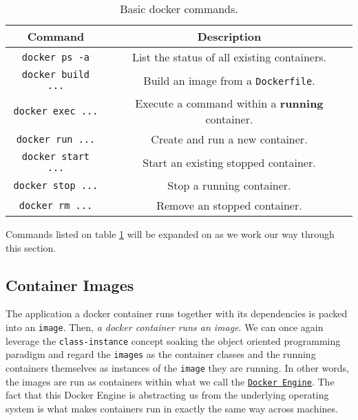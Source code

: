             \begin{table}
                \centering
                \begin{tabular}{|c|c|}
                    \hline
                    \textbf{Command} & \textbf{Description}\\
                    \hline
                    \texttt{docker ps -a} & List the status of all existing containers.\\
                    \hline
                    \texttt{docker build ...} & Build an image from a \texttt{Dockerfile}.\\
                    \hline
                    \texttt{docker exec ...} & Execute a command within a \textbf{running} container.\\
                    \hline
                    \texttt{docker run ...} & Create and run a new container.\\
                    \hline
                    \texttt{docker start ...} & Start an existing stopped container.\\
                    \hline
                    \texttt{docker stop ...} & Stop a running container.\\
                    \hline
                    \texttt{docker rm ...} & Remove an stopped container.\\
                    \hline
                \end{tabular}
                \caption{Basic docker commands.}
                \label{tab:docker-commands}
            \end{table}

            Commands listed on table \ref{tab:docker-commands} will be expanded on as we work our way through this section.\\

        \subsection{Container Images}
            The application a docker container runs together with its dependencies is packed into an \texttt{image}. Then, \textit{a docker container runs an image}. We can once again leverage the \texttt{class-instance} concept soaking the object oriented programming paradigm and regard the \texttt{images} as the container classes and the running containers themselves as instances of the \texttt{image} they are running. In other words, the images are run as containers within what we call the \href{https://www.docker.com/products/container-runtime}{\texttt{Docker Engine}}. The fact that this Docker Engine is abstracting us from the underlying operating system is what makes containers run in exactly the same way across machines.\\

